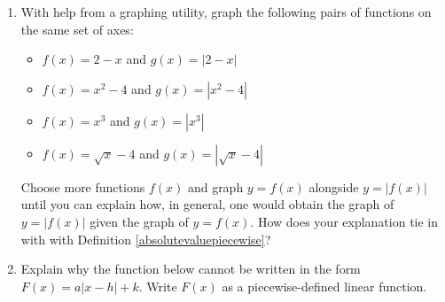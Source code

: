 \newpage

\begin{enumerate}
\setcounter{enumi}{\value{HW}}

\item \label{makeaveewithabsval} With help from a graphing utility, graph the following pairs of functions on the same set of axes:

\begin{multicols}{2}

\begin{itemize}


\item  $f(x) = 2-x$ and $g(x) = | 2-x |$

\item  $f(x) = x^2-4$ and $g(x) = | x^2 -4 |$

\end{itemize}

\end{multicols}

\begin{multicols}{2}

\begin{itemize}

\item  $f(x) = x^3$ and $g(x) = | x^3 |$

\item  $f(x) = \sqrt{x}-4 $ and $g(x) = | \sqrt{x} -4| $

\end{itemize}

\end{multicols}


Choose more functions $f(x)$ and graph $y = f(x)$ alongside $y = | f(x)|$ until you can explain how, in general, one would obtain the graph of $y = | f(x) |$ given the graph of $y = f(x)$.  How does your explanation tie in with  with Definition \ref{absolutevaluepiecewise}?



\item Explain why the function below cannot be written in the form $F(x) = a|x-h|+k$.  Write $F(x)$ as a piecewise-defined linear function.

\begin{center}


\end{center}
\end{enumerate}
